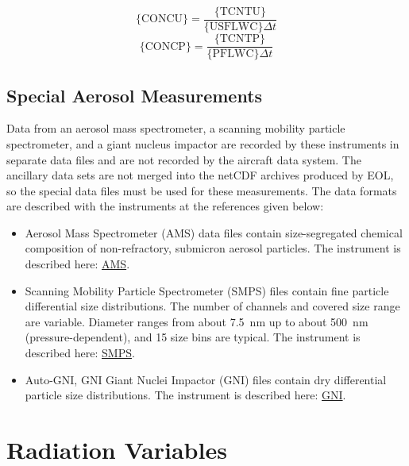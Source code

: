\documentclass[
]{book}
\providecommand{\tightlist}{%
  \setlength{\itemsep}{0pt}\setlength{\parskip}{0pt}}
\begin{document}
\begin{equation}
\mathrm{\{CONCU\}}=\frac{\mathrm{\{TCNTU\}}}{\mathrm{\{USFLWC\}}\Delta t}
\label{eq:CONCUbox1}
\end{equation}
\begin{equation}
\mathrm{\{CONCP\}}=\frac{\mathrm{\{TCNTP\}}}{\mathrm{\{PFLWC\}}\Delta t}
\label{eq:CONCUbox2}
\end{equation}

\hypertarget{special-aerosol}{%
\section{Special Aerosol Measurements}\label{special-aerosol}}

Data from an aerosol mass spectrometer, a scanning mobility particle spectrometer, and a giant nucleus impactor are recorded by these instruments in separate data files and are not recorded by the aircraft data system. The ancillary data sets are not merged into the netCDF archives produced by EOL, so the special data files must be used for these measurements. The data formats are described with the instruments at the references given below:

\begin{itemize}
\tightlist
\item
  Aerosol Mass Spectrometer (AMS) data files contain size-segregated chemical composition of non-refractory, submicron aerosol particles. The instrument is described here: \href{https://www.eol.ucar.edu/instruments/time-flight-aerosol-mass-spectrometer}{AMS}.\\
\item
  Scanning Mobility Particle Spectrometer (SMPS) files contain fine particle differential size distributions. The number of channels and covered size range are variable. Diameter ranges from about 7.5~nm up to about 500~nm (pressure-dependent), and 15 size bins are typical. The instrument is described here: \href{https://www.eol.ucar.edu/instruments/scanning-mobility-particle-spectrometer}{SMPS}.\\
\item
  Auto-GNI, GNI Giant Nuclei Impactor (GNI) files contain dry differential particle size distributions. The instrument is described here: \href{https://www.eol.ucar.edu/instruments/giant-nuclei-impactor}{GNI}.
\end{itemize}

\hypertarget{radiation-variables}{%
\chapter{Radiation Variables}\label{radiation-variables}}
\end{document}
